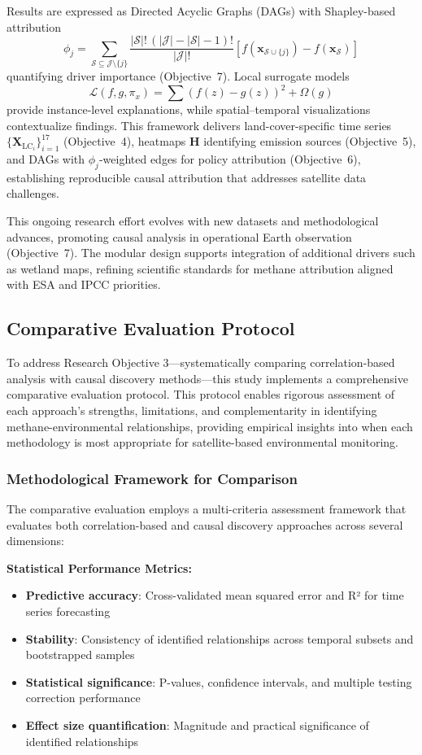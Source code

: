 Results are expressed as Directed Acyclic Graphs (DAGs) with Shapley-based attribution
\[
	\phi_j = \sum_{\mathcal{S} \subseteq \mathcal{J} \setminus \{j\}}
	\frac{|\mathcal{S}|! \,(|\mathcal{J}| - |\mathcal{S}| - 1)!}{|\mathcal{J}|!}
	\left[ f(\mathbf{x}_{\mathcal{S} \cup \{j\}}) - f(\mathbf{x}_{\mathcal{S}}) \right]
\]
quantifying driver importance (Objective~7). Local surrogate models
\[
	\mathcal{L}(f,g,\pi_x) = \sum (f(z) - g(z))^2 + \Omega(g)
\]
provide instance-level explanations, while spatial–temporal visualizations contextualize findings. This framework delivers land-cover-specific time series $\{\mathbf{X}_{\mathrm{LC}_i}\}_{i=1}^{17}$ (Objective~4), heatmaps $\mathbf{H}$ identifying emission sources (Objective~5), and DAGs with $\phi_j$-weighted edges for policy attribution (Objective~6), establishing reproducible causal attribution that addresses satellite data challenges.

This ongoing research effort evolves with new datasets and methodological advances, promoting causal analysis in operational Earth observation (Objective~7). The modular design supports integration of additional drivers such as wetland maps, refining scientific standards for methane attribution aligned with ESA and IPCC priorities.

\subsection{Comparative Evaluation Protocol}
\label{sec:comparative_evaluation}

To address Research Objective 3—systematically comparing correlation-based analysis with causal discovery methods—this study implements a comprehensive comparative evaluation protocol. This protocol enables rigorous assessment of each approach's strengths, limitations, and complementarity in identifying methane-environmental relationships, providing empirical insights into when each methodology is most appropriate for satellite-based environmental monitoring.

\subsubsection{Methodological Framework for Comparison}

The comparative evaluation employs a multi-criteria assessment framework that evaluates both correlation-based and causal discovery approaches across several dimensions:

\textbf{Statistical Performance Metrics:}
\begin{itemize}
	\item \textbf{Predictive accuracy}: Cross-validated mean squared error and R² for time series forecasting
	\item \textbf{Stability}: Consistency of identified relationships across temporal subsets and bootstrapped samples
	\item \textbf{Statistical significance}: P-values, confidence intervals, and multiple testing correction performance
	\item \textbf{Effect size quantification}: Magnitude and practical significance of identified relationships
\end{itemize}

